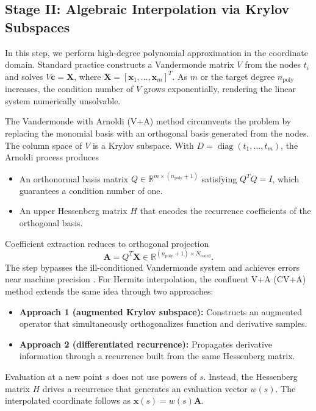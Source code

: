 \documentclass[11pt]{article}
\begin{document}
\subsection{Stage II: Algebraic Interpolation via Krylov Subspaces}

In this step, we perform high-degree polynomial approximation in the coordinate domain. Standard practice constructs a Vandermonde matrix $V$ from the nodes $t_i$ and solves $V \mathbf{c} = \mathbf{X}$, where $\mathbf{X} = [\mathbf{x}_1, \ldots, \mathbf{x}_m]^T$. As $m$ or the target degree $n_{\text{poly}}$ increases, the condition number of $V$ grows exponentially, rendering the linear system numerically unsolvable.

The Vandermonde with Arnoldi (V+A) method circumvents the problem by replacing the monomial basis with an orthogonal basis generated from the nodes. The column space of $V$ is a Krylov subspace. With $D = \operatorname{diag}(t_1,\dots,t_m)$, the Arnoldi process produces

\begin{itemize}
    \item An orthonormal basis matrix $Q \in \mathbb{R}^{m \times (n_{\text{poly}}+1)}$ satisfying $Q^T Q = I$, which guarantees a condition number of one.
    \item An upper Hessenberg matrix $H$ that encodes the recurrence coefficients of the orthogonal basis.
\end{itemize}

Coefficient extraction reduces to orthogonal projection
 $$
\mathbf{A} = Q^T \mathbf{X} \in \mathbb{R}^{(n_{\text{poly}}+1) \times N_{\text{coord}}}.
 $$
The step bypasses the ill-conditioned Vandermonde system and achieves errors near machine precision \cite{Zhang2024ArnoldiFitting,zhang2025multivariate}.
For Hermite interpolation, the confluent V+A (CV+A) method extends the same idea through two approaches:
\begin{itemize}
    \item \textbf{Approach 1 (augmented Krylov subspace):} Constructs an augmented operator that simultaneously orthogonalizes function and derivative samples.
    \item \textbf{Approach 2 (differentiated recurrence):} Propagates derivative information through a recurrence built from the same Hessenberg matrix.
\end{itemize}

Evaluation at a new point $s$ does not use powers of $s$. Instead, the Hessenberg matrix $H$ drives a recurrence that generates an evaluation vector $w(s)$. The interpolated coordinate follows as $\mathbf{x}(s) = w(s) \mathbf{A}$.
 
\end{document}
